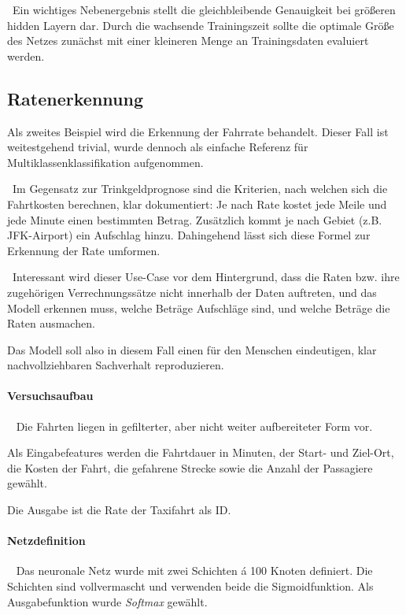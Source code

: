 ~\newline Ein wichtiges Nebenergebnis stellt die gleichbleibende Genauigkeit bei größeren hidden Layern dar. Durch die wachsende Trainingszeit sollte die optimale Größe des Netzes zunächst mit einer kleineren Menge an Trainingsdaten evaluiert werden.  
\newpage
\subsection{Ratenerkennung}
\label{sec:RatePred}
Als zweites Beispiel wird die Erkennung der Fahrrate behandelt. Dieser Fall ist weitestgehend trivial, wurde dennoch als einfache Referenz für Multiklassenklassifikation aufgenommen. 

~\newline Im Gegensatz zur Trinkgeldprognose sind die Kriterien, nach welchen sich die Fahrtkosten berechnen, klar dokumentiert: Je nach Rate kostet jede Meile und jede Minute einen bestimmten Betrag. Zusätzlich kommt je nach Gebiet (z.B. JFK-Airport) ein Aufschlag hinzu. Dahingehend lässt sich diese Formel zur Erkennung der Rate umformen.

~\newline Interessant wird dieser Use-Case vor dem Hintergrund, dass die Raten bzw. ihre zugehörigen Verrechnungssätze nicht innerhalb der Daten auftreten, und das Modell erkennen muss, welche Beträge Aufschläge sind, und welche Beträge die Raten ausmachen. 

Das Modell soll also in diesem Fall einen für den Menschen eindeutigen, klar nachvollziehbaren Sachverhalt reproduzieren. 
\paragraph{Versuchsaufbau} ~\newline
Die Fahrten liegen in gefilterter, aber nicht weiter aufbereiteter Form vor. 

Als Eingabefeatures werden die Fahrtdauer in Minuten, der Start- und Ziel-Ort, die Kosten der Fahrt, die gefahrene Strecke sowie die Anzahl der Passagiere gewählt. 

Die Ausgabe ist die Rate der Taxifahrt als ID.
\paragraph{Netzdefinition} ~\newline
Das neuronale Netz wurde mit zwei Schichten á 100 Knoten definiert. Die Schichten sind vollvermascht und verwenden beide die Sigmoidfunktion. Als Ausgabefunktion wurde \textit{Softmax} gewählt.

